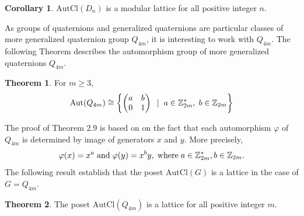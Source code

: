 \documentclass{article}
\theoremstyle{definition}
\newtheorem{theorem}{Theorem}[section]
\newtheorem{corollary}{Corollary}[theorem]
\begin{document}
\begin{corollary}
     $\text{AutCl}(D_n)$ is a modular lattice for all positive integer $n$. 
\end{corollary}
As groups of quaternions and generalized quaternions are particular classes of more generalized quaternion group $Q_{4m}$, it is interesting to work with $Q_{4m}$. The following Theorem describes the automorphism group of more generalized quaternions $Q_{4m}$.
\begin{theorem} \cite{conradquad}
    For $m\ge 3 $, \begin{equation*}
        \text{Aut}(Q_{4m})\cong \biggl\{\begin{pmatrix}
            a & b \\ 0 & 1
        \end{pmatrix}\hspace{0.2cm}|\hspace{0.2cm} a \in \mathbb{Z}_{2m}^*,\hspace{0.1cm} b\in \mathbb{Z}_{2m} \biggr\}    \end{equation*}
\end{theorem}
The proof of Theorem 2.9 is based on on the fact that each automorphism $\varphi$ of $Q_{4m}$ is determined by image of generators $x$ and $y$. More precisely, \begin{equation*}
    \varphi(x)=x^a \hspace{0.1cm}\text{and}\hspace{0.1cm} \varphi(y)=x^by,\hspace{0.1cm} \text{where} \hspace{0.1cm} a\in \mathbb{Z}_{2m}^*, b \in \mathbb{Z}_{2m}.
    \end{equation*}
    The following result establish that the poset $\text{AutCl}(G)$ is a lattice in the case of $G=Q_{4m}$.
    \begin{theorem}
        The poset $\text{AutCl}(Q_{4m})$ is a lattice for all positive integer $m$.
    \end{theorem}
\end{document}
